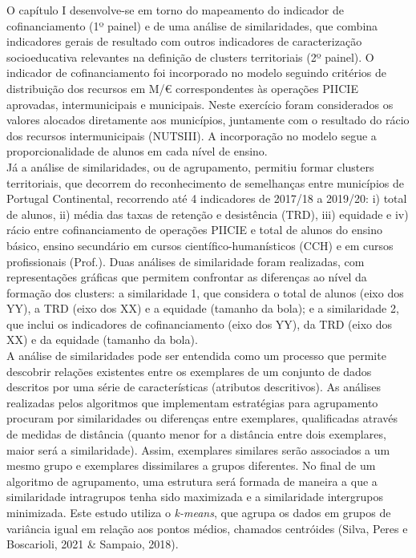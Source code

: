 \documentclass[
]{book}
\begin{document}
O capítulo I desenvolve-se em torno do mapeamento do indicador de cofinanciamento (1º painel) e de uma análise de similaridades, que combina indicadores gerais de resultado com outros indicadores de caracterização socioeducativa relevantes na definição de clusters territoriais (2º painel).
O indicador de cofinanciamento foi incorporado no modelo seguindo critérios de distribuição dos recursos em M/€ correspondentes às operações PIICIE aprovadas, intermunicipais e municipais. Neste exercício foram considerados os valores alocados diretamente aos municípios, juntamente com o resultado do rácio dos recursos intermunicipais (NUTSIII). A incorporação no modelo segue a proporcionalidade de alunos em cada nível de ensino.\\
Já a análise de similaridades, ou de agrupamento, permitiu formar clusters territoriais, que decorrem do reconhecimento de semelhanças entre municípios de Portugal Continental, recorrendo até 4 indicadores de 2017/18 a 2019/20: i) total de alunos, ii) média das taxas de retenção e desistência (TRD), iii) equidade e iv) rácio entre cofinanciamento de operações PIICIE e total de alunos do ensino básico, ensino secundário em cursos científico-humanísticos (CCH) e em cursos profissionais (Prof.). Duas análises de similaridade foram realizadas, com representações gráficas que permitem confrontar as diferenças ao nível da formação dos clusters: a similaridade 1, que considera o total de alunos (eixo dos YY), a TRD (eixo dos XX) e a equidade (tamanho da bola); e a similaridade 2, que inclui os indicadores de cofinanciamento (eixo dos YY), da TRD (eixo dos XX) e da equidade (tamanho da bola).\\
A análise de similaridades pode ser entendida como um processo que permite descobrir relações existentes entre os exemplares de um conjunto de dados descritos por uma série de características (atributos descritivos). As análises realizadas pelos algoritmos que implementam estratégias para agrupamento procuram por similaridades ou diferenças entre exemplares, qualificadas através de medidas de distância (quanto menor for a distância entre dois exemplares, maior será a similaridade). Assim, exemplares similares serão associados a um mesmo grupo e exemplares dissimilares a grupos diferentes. No final de um algoritmo de agrupamento, uma estrutura será formada de maneira a que a similaridade intragrupos tenha sido maximizada e a similaridade intergrupos minimizada. Este estudo utiliza o \emph{k-means}, que agrupa os dados em grupos de variância igual em relação aos pontos médios, chamados centróides (Silva, Peres e Boscarioli, 2021 \& Sampaio, 2018).
\end{document}
